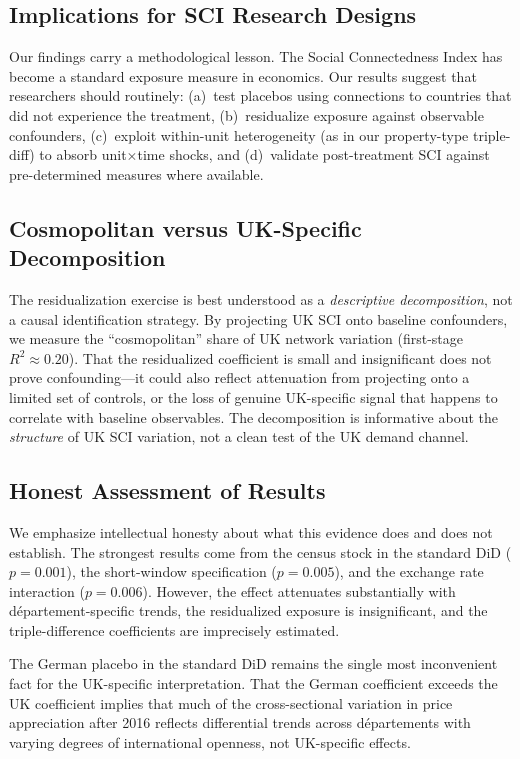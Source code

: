 \documentclass[12pt]{article}
\begin{document}
\subsection{Implications for SCI Research Designs}

Our findings carry a methodological lesson. The Social Connectedness Index has become a standard exposure measure in economics. Our results suggest that researchers should routinely: (a)~test placebos using connections to countries that did not experience the treatment, (b)~residualize exposure against observable confounders, (c)~exploit within-unit heterogeneity (as in our property-type triple-diff) to absorb unit$\times$time shocks, and (d)~validate post-treatment SCI against pre-determined measures where available.

\subsection{Cosmopolitan versus UK-Specific Decomposition}

The residualization exercise is best understood as a \textit{descriptive decomposition}, not a causal identification strategy. By projecting UK SCI onto baseline confounders, we measure the ``cosmopolitan'' share of UK network variation (first-stage $R^2 \approx 0.20$). That the residualized coefficient is small and insignificant does not prove confounding---it could also reflect attenuation from projecting onto a limited set of controls, or the loss of genuine UK-specific signal that happens to correlate with baseline observables. The decomposition is informative about the \textit{structure} of UK SCI variation, not a clean test of the UK demand channel.

\subsection{Honest Assessment of Results}

We emphasize intellectual honesty about what this evidence does and does not establish. The strongest results come from the census stock in the standard DiD ($p = 0.001$), the short-window specification ($p = 0.005$), and the exchange rate interaction ($p = 0.006$). However, the effect attenuates substantially with d\'epartement-specific trends, the residualized exposure is insignificant, and the triple-difference coefficients are imprecisely estimated.

The German placebo in the standard DiD remains the single most inconvenient fact for the UK-specific interpretation. That the German coefficient exceeds the UK coefficient implies that much of the cross-sectional variation in price appreciation after 2016 reflects differential trends across d\'epartements with varying degrees of international openness, not UK-specific effects.
\end{document}
